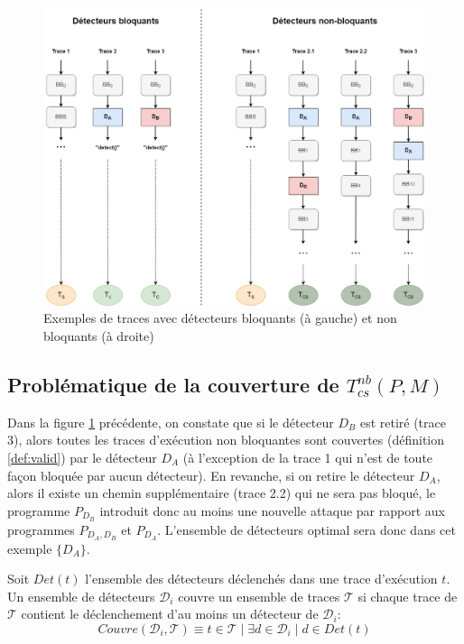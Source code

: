             \begin{figure}[!htb]\centering
                \includegraphics[scale=0.3]{ch6-ccpo/img/CCP-prop-stopping2.png}
                \caption{Exemples de traces avec détecteurs bloquants (à gauche) et non bloquants (à droite)}
                \label{fig:stop-not-to-stop}
            \end{figure}
            
        \subsection{Problématique de la couverture de $T_{cs}^{nb}(P, M)$} 
        \label{sec:ch6:valid-problematic}
        
            Dans la figure \ref{fig:stop-not-to-stop} précédente, on constate que si le détecteur $D_B$ est retiré (trace 3), alors toutes les traces d'exécution non bloquantes sont couvertes (définition \ref{def:valid}) par le détecteur $D_A$ (à l'exception de la trace 1 qui n'est de toute façon bloquée par aucun détecteur). En revanche, si on retire le détecteur $D_A$, alors il existe un chemin supplémentaire (trace 2.2) qui ne sera pas bloqué, le programme $P_{D_B}$ introduit donc au moins une nouvelle attaque par rapport aux programmes $P_{D_A, D_B}$ et $P_{D_A}$. L'ensemble de détecteurs optimal sera donc dans cet exemple $\{ D_A \}$. 
   
            \begin{defi} 
                \label{def:valid}
                Soit $Det(t)$ l'ensemble des détecteurs déclenchés dans une trace d'exécution $t$.
                Un ensemble de détecteurs $\mathcal{D}_i$ couvre un ensemble de traces $\mathcal{T}$ si chaque trace de $\mathcal{T}$ contient le déclenchement d'au moins un détecteur de $\mathcal{D}_i$:  
            \begin{equation*}
                Couvre(\mathcal{D}_i, \mathcal{T}) \equiv  t \in \mathcal{T} \mid \exists d \in \mathcal{D}_i  \mid  d \in Det(t)
            \end{equation*}                 
            \end{defi} 
            
